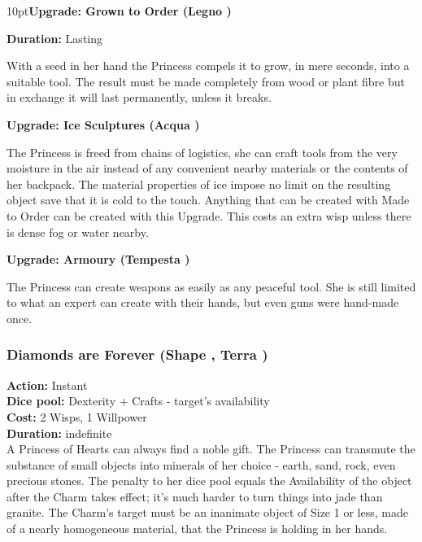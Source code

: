 \begin{myindentpar}{10pt}\textbf{Upgrade: Grown to Order (Legno \textbullet\textbullet)}

\noindent \textbf{Duration:} Lasting

With a seed in her hand the Princess compels it to grow, in mere seconds, into a suitable tool. The result must be made completely from wood or plant fibre but in exchange it will last permanently, unless it breaks.

\textbf{Upgrade: Ice Sculptures (Acqua \textbullet\textbullet)}

The Princess is freed from chains of logistics, she can craft tools from the very moisture in the air instead of any convenient nearby materials or the contents of her backpack. The material properties of ice impose no limit on the resulting object save that it is cold to the touch. Anything that can be created with Made to Order can be created with this Upgrade. This costs an extra wisp unless there is dense fog or water nearby.

\textbf{Upgrade: Armoury (Tempesta \textbullet\textbullet)}

The Princess can create weapons as easily as any peaceful tool. She is still limited to what an expert can create with their hands, but even guns were hand-made once.\end{myindentpar}

\subsubsection*{Diamonds are Forever (Shape \textbullet\textbullet\textbullet, Terra \textbullet\textbullet\textbullet)}

\textbf{Action:} Instant\\
\textbf{Dice pool:} Dexterity + Crafts - target's availability\\
\textbf{Cost:} 2 Wisps, 1 Willpower\\
\textbf{Duration:} indefinite\\

\noindent A Princess of Hearts can always find a noble gift. The Princess can transmute the substance of small objects into minerals of her choice - earth, sand, rock, even precious stones. The penalty to her dice pool equals the Availability of the object after the Charm takes effect; it’s much harder to turn things into jade than granite. The Charm’s target must be an inanimate object of Size 1 or less, made of a nearly homogeneous material, that the Princess is holding in her hands.

